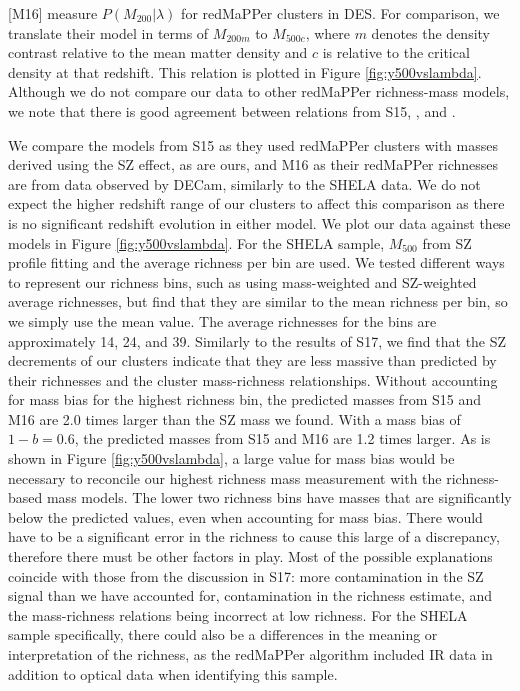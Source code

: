 \documentclass[a4paper,fleqn,usenatbib]{mnras}
\begin{document}
\cite{2016arXiv161006890M} [M16] measure $P(M_{200}|\lambda)$ for redMaPPer clusters in DES. 
For comparison, we translate their model in terms of $M_{200m}$ to $M_{500c}$, where $m$ denotes the density contrast relative to the mean matter density and $c$ is relative to the critical density at that redshift. 
This relation is plotted in Figure \ref{fig:y500vslambda}. 
Although we do not compare our data to other redMaPPer richness-mass models, we note that there is good agreement between relations from S15, \citet[][which is calibrated for clusters in SDSS]{2017MNRAS.466.3103S}, and \citet[][which is calibrated for clusters in DES Year 1 data]{2018arXiv180500039M}.

We compare the models from S15 as they used redMaPPer clusters with masses derived using the SZ effect, as are ours, and M16 as their redMaPPer richnesses are from data observed by DECam, similarly to the SHELA data. 
We do not expect the higher redshift range of our clusters to affect this comparison as there is no significant redshift evolution in either model. 
We plot our data against these models in Figure \ref{fig:y500vslambda}. For the SHELA sample, $M_{500}$ from SZ profile fitting and the average richness per bin are used. 
We tested different ways to represent our richness bins, such as using mass-weighted and SZ-weighted average richnesses, but find that they are similar to the mean richness per bin, so we simply use the mean value. 
The average richnesses for the bins are approximately 14, 24, and 39. 
Similarly to the results of S17, we find that the SZ decrements of our clusters indicate that they are less massive than predicted by their richnesses and the cluster mass-richness relationships.
Without accounting for mass bias for the highest richness bin, the predicted masses from S15 and M16 are 2.0 times larger than the SZ mass we found. 
With a  mass bias of $1-b = 0.6$, the predicted masses from S15 and M16 are 1.2 times larger. 
As is shown in Figure \ref{fig:y500vslambda}, a large value for mass bias would be necessary to reconcile our highest richness mass measurement with the richness-based mass models. 
The lower two richness bins have masses that are significantly below the predicted values, even when accounting for mass bias.
There would have to be a significant error in the richness to cause this large of a discrepancy, therefore there must be other factors in play. 
Most of the possible explanations coincide with those from the discussion in S17: more contamination in the SZ signal than we have accounted for, contamination in the richness estimate, and the mass-richness relations being incorrect at low richness. 
For the SHELA sample specifically, there could also be a differences in the meaning or interpretation of the richness, as the redMaPPer algorithm included IR data in addition to optical data when identifying this sample.
\end{document}
